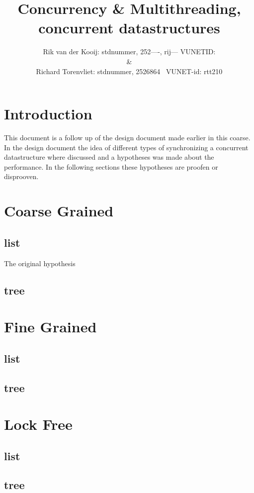 \documentclass[10pt,a4paper]{article}
\author{Rik van der Kooij: stdnummer, 252----, rij--- VUNETID: \\ \&  \\ Richard Torenvliet: stdnummer, 2526864 \ VUNET-id: rtt210}
\title{Concurrency \& Multithreading, concurrent datastructures}
\begin{document}
\maketitle
\tableofcontents
\section{Introduction}
This document is a follow up of the design document made earlier in this coarse. In the design document the idea of different types of synchronizing a concurrent datastructure where discussed and a hypotheses was made about the performance. In the following sections these hypotheses are proofen or disprooven.

\section{Coarse Grained}
\subsection{list}
The original hypothesis
\subsection{tree}

\section{Fine Grained}
\subsection{list}
\subsection{tree}

\section{Lock Free}
\subsection{list}
\subsection{tree}
\end{document}
